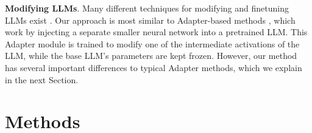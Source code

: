 \documentclass[11pt]{article}
\begin{document}
\textbf{Modifying LLMs}.
Many different techniques for modifying and finetuning LLMs exist \citet{ding2022delta}.
Our approach is most similar to Adapter-based methods \citep{houlsby2019parameter}, which work by injecting a separate smaller neural network into a pretrained LLM. This Adapter module is trained to modify one of the intermediate activations of the LLM, while the base LLM's parameters are kept frozen.
However, our method has several important differences to typical Adapter methods, which we explain in the next Section.%



\section{Methods}
\label{section-methods}
\end{document}
